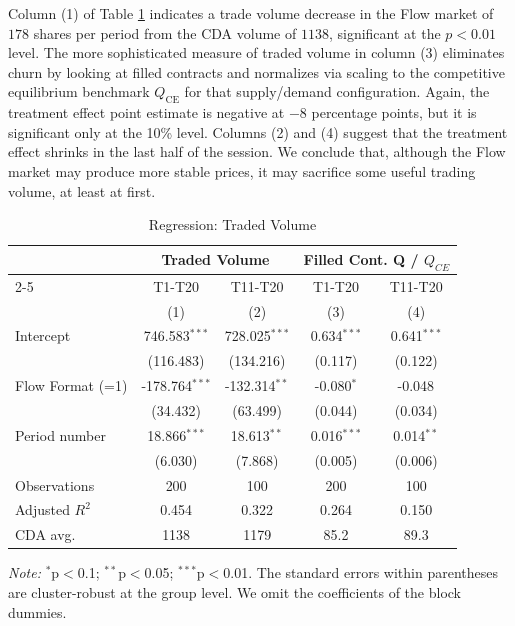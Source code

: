 Column (1) of Table \ref{tab:Volume} indicates a trade volume decrease in the Flow market of $178$ shares per period from the CDA volume of $1138$, significant at the $p<0.01$ level. %
The more sophisticated measure of traded volume in column (3) eliminates churn by looking at filled contracts and normalizes via scaling to the competitive equilibrium benchmark \(Q_{\text{CE}}\)  for that supply/demand configuration. 
Again, the treatment effect point estimate is negative at $-8$ percentage points, but it is significant only at the 10\% level.
Columns (2) and (4) suggest that the treatment effect shrinks in the last half of the session. %
We conclude that, although the Flow market may produce more stable prices, it may sacrifice some useful trading volume, at least at first. 


\begin{table}
\centering    
\caption{Regression: Traded Volume}
\begin{threeparttable}
\begin{tabular}{@{\extracolsep{5pt}}lcccc}
\toprule
& \multicolumn{2}{c}{Traded Volume} & \multicolumn{2}{c}{Filled Cont. Q / $Q_{CE}$} \\
\cmidrule{2-5}
& T1-T20 & T11-T20 & T1-T20 & T11-T20 \\
& (1) & (2) & (3) & (4) \\
\midrule
Intercept & 746.583$^{***}$ & 728.025$^{***}$ & 0.634$^{***}$ & 0.641$^{***}$ \\
 & (116.483) & (134.216) & (0.117) & (0.122) \\
Flow Format (=1) & -178.764$^{***}$ & -132.314$^{**}$ & -0.080$^{*}$ & -0.048$^{}$ \\
 & (34.432) & (63.499) & (0.044) & (0.034) \\
Period number & 18.866$^{***}$ & 18.613$^{**}$ & 0.016$^{***}$ & 0.014$^{**}$ \\
 & (6.030) & (7.868) & (0.005) & (0.006) \\
\midrule
Observations & 200 & 100 & 200 & 100 \\
Adjusted $R^2$ & 0.454 & 0.322 & 0.264 & 0.150 \\
\midrule
CDA avg. & 1138 & 1179 & 85.2 & 89.3 \\
\bottomrule
\end{tabular}
\begin{tablenotes}[para]
\footnotesize
\textit{Note:} $^{*}$p$<$0.1; $^{**}$p$<$0.05; $^{***}$p$<$0.01. The standard errors within parentheses are cluster-robust at the group level. We omit the coefficients of the block dummies. 
\end{tablenotes}
\end{threeparttable}
\label{tab:Volume}
\end{table}

